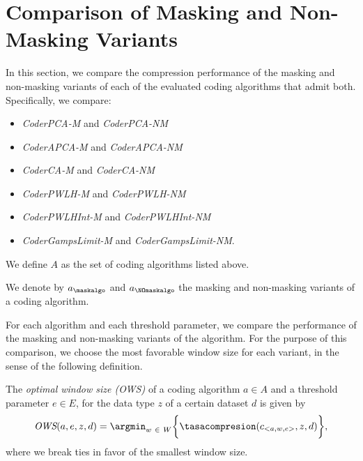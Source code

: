 
\section{Comparison of Masking and Non-Masking Variants}
\label{secX:rendimiento-relativo}


In this section, we compare the compression performance of the masking and non-masking variants of each of the evaluated coding algorithms that admit both. Specifically, we compare:


\vspace{-5pt}
\begin{itemize}
    \item \textit{CoderPCA-M} and \textit{CoderPCA-NM}
    \item \textit{CoderAPCA-M} and \textit{CoderAPCA-NM}
    \item \textit{CoderCA-M} and \textit{CoderCA-NM}
    \item \textit{CoderPWLH-M} and \textit{CoderPWLH-NM}
    \item \textit{CoderPWLHInt-M} and \textit{CoderPWLHInt-NM} 
    \item \textit{CoderGampsLimit-M} and \textit{CoderGampsLimit-NM}.
\end{itemize}


\vspace{+3pt}
\begin{defcion}
We define $A$ as the set of coding algorithms listed above. 
\end{defcion}


\begin{notation}
We denote by $a_\maskalgo$ and $a_\NOmaskalgo$ the masking and non-masking variants of a coding algorithm.
\end{notation}


For each algorithm and each threshold parameter, we compare the performance of the masking and non-masking variants of the algorithm. For the purpose of this comparison, we choose the most favorable window size for each variant, in the sense of the following definition.


\newcommand{\ows}{\textit{OWS}}
\begin{defcion}
The \textit{optimal window size (\ows)} of a coding algorithm $a \in A$ and a threshold parameter $e \in E$, for the data type $z$ of a certain dataset $d$ is given by
\begin{equation}
\label{eq:ows}
\ows(a, e, z, d) = \argmin_{w\ \in \ W} \biggl\{ \tasacompresion(c_{<a, w, e>}, z, d) \biggr\},
\end{equation}
where we break ties in favor of the smallest window size.
\end{defcion}


